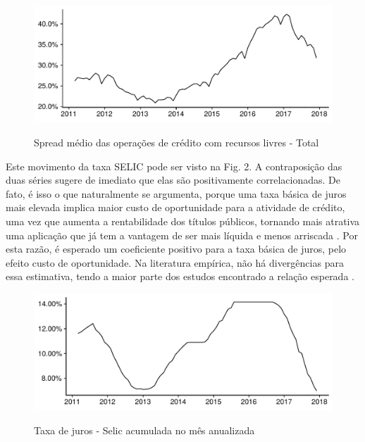 \documentclass[a4paper,
               article,
               12pt,
               openany,
               oneside,
               english,
               brazil]{abntex2}
\numberwithin{equation}{section}
\begin{document}
    \begin{figure}[h]
        \centering
        \caption{Spread médio das operações de crédito com recursos livres - Total}
        \includegraphics[width = \textwidth, scale=0.75]{Spread.pdf}
        \label{spread}
    \end{figure}

    Este movimento da taxa SELIC pode ser visto na Fig. 2. A contraposição das duas séries sugere de imediato que elas são positivamente correlacionadas. De fato, é isso o que naturalmente se argumenta, porque uma taxa básica de juros mais elevada implica maior custo de oportunidade para a atividade de crédito, uma vez que aumenta a rentabilidade dos títulos públicos, tornando mais atrativa uma aplicação que já tem a vantagem de ser mais líquida e menos arriscada \cite[p.~372]{oliveira2007}. Por esta razão, é esperado um coeficiente positivo para a taxa básica de juros, pelo efeito custo de oportunidade. Na literatura empírica, não há divergências para essa estimativa, tendo a maior parte dos estudos encontrado a relação esperada \cite[p.~233-234]{leal07}.

    \begin{figure}[h]
        \centering
        \caption{Taxa de juros - Selic acumulada no mês anualizada}
        \includegraphics[width = \textwidth, scale=0.75]{Selic.pdf}
        \label{selic}
    \end{figure}
\end{document}
